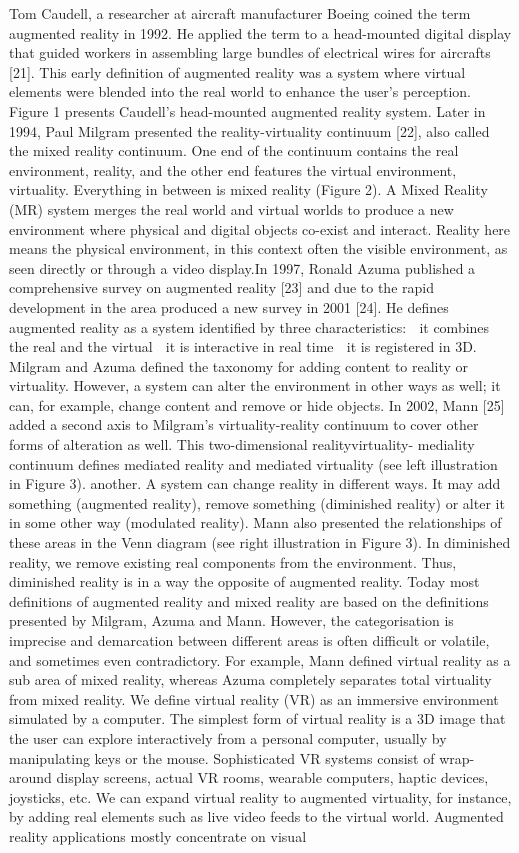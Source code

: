 Tom Caudell, a researcher at aircraft manufacturer Boeing coined the term augmented reality in 1992. He applied the term to a head-mounted digital display that guided workers in assembling large bundles of electrical wires for aircrafts [21]. This early definition of augmented reality was a system where virtual elements were blended into the real world to enhance the user’s perception. Figure 1 presents Caudell’s head-mounted augmented reality system. Later in 1994, Paul Milgram presented the reality-virtuality continuum [22], also called the mixed reality continuum. One end of the continuum contains the real environment, reality, and the other end features the virtual environment, virtuality. Everything in between is mixed reality (Figure 2). A Mixed Reality (MR) system merges the real world and virtual worlds to produce a new environment where physical and digital objects co-exist and interact. Reality here means the physical environment, in this context often the visible environment, as seen directly or through a video display.In 1997, Ronald Azuma published a comprehensive survey on augmented reality [23] and due to the rapid development in the area produced a new survey in 2001 [24]. He defines augmented reality as a system identified by three characteristics: 􀁸 it combines the real and the virtual 􀁸 it is interactive in real time 􀁸 it is registered in 3D. Milgram and Azuma defined the taxonomy for adding content to reality or virtuality. However, a system can alter the environment in other ways as well; it can, for example, change content and remove or hide objects. In 2002, Mann [25] added a second axis to Milgram’s virtuality-reality continuum to cover other forms of alteration as well. This two-dimensional realityvirtuality- mediality continuum defines mediated reality and mediated virtuality (see left illustration in Figure 3). another. A system can change reality in different ways. It may add something (augmented reality), remove something (diminished reality) or alter it in some other way (modulated reality). Mann also presented the relationships of these areas in the Venn diagram (see right illustration in Figure 3). In diminished reality, we remove existing real components from the environment. Thus, diminished reality is in a way the opposite of augmented reality. Today most definitions of augmented reality and mixed reality are based on the definitions presented by Milgram, Azuma and Mann. However, the categorisation is imprecise and demarcation between different areas is often difficult or volatile, and sometimes even contradictory. For example, Mann defined virtual reality as a sub area of mixed reality, whereas Azuma completely separates total virtuality from mixed reality. We define virtual reality (VR) as an immersive environment simulated by a computer. The simplest form of virtual reality is a 3D image that the user can explore interactively from a personal computer, usually by manipulating keys or the mouse. Sophisticated VR systems consist of wrap-around display screens, actual VR rooms, wearable computers, haptic devices, joysticks, etc. We can expand virtual reality to augmented virtuality, for instance, by adding real elements such as live video feeds to the virtual world. Augmented reality applications mostly concentrate on visual 